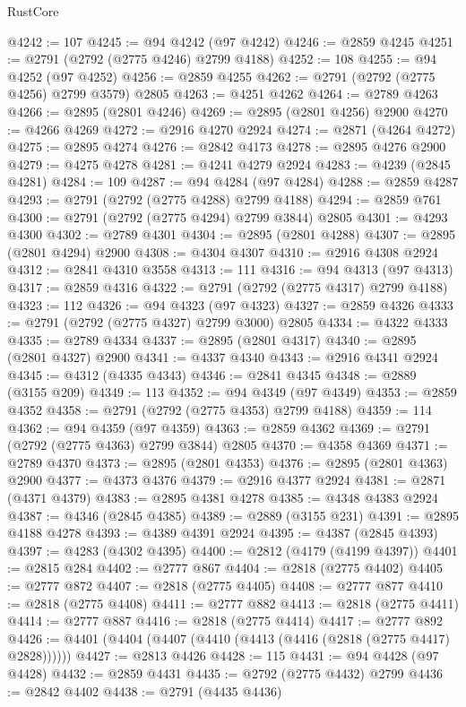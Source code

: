 \begin{lexlean}{RustCore}
\begin{coremodule}
@4242 := 107
@4245 := @94 @4242 (@97 @4242)
@4246 := @2859 @4245
@4251 := @2791 (@2792 (@2775 @4246) @2799 @4188)
@4252 := 108
@4255 := @94 @4252 (@97 @4252)
@4256 := @2859 @4255
@4262 := @2791 (@2792 (@2775 @4256) @2799 @3579) @2805
@4263 := @4251 @4262
@4264 := @2789 @4263
@4266 := @2895 (@2801 @4246)
@4269 := @2895 (@2801 @4256) @2900
@4270 := @4266 @4269
@4272 := @2916 @4270 @2924
@4274 := @2871 (@4264 @4272)
@4275 := @2895 @4274
@4276 := @2842 @4173
@4278 := @2895 @4276 @2900
@4279 := @4275 @4278
@4281 := @4241 @4279 @2924
@4283 := @4239 (@2845 @4281)
@4284 := 109
@4287 := @94 @4284 (@97 @4284)
@4288 := @2859 @4287
@4293 := @2791 (@2792 (@2775 @4288) @2799 @4188)
@4294 := @2859 @761
@4300 := @2791 (@2792 (@2775 @4294) @2799 @3844) @2805
@4301 := @4293 @4300
@4302 := @2789 @4301
@4304 := @2895 (@2801 @4288)
@4307 := @2895 (@2801 @4294) @2900
@4308 := @4304 @4307
@4310 := @2916 @4308 @2924
@4312 := @2841 @4310 @3558
@4313 := 111
@4316 := @94 @4313 (@97 @4313)
@4317 := @2859 @4316
@4322 := @2791 (@2792 (@2775 @4317) @2799 @4188)
@4323 := 112
@4326 := @94 @4323 (@97 @4323)
@4327 := @2859 @4326
@4333 := @2791 (@2792 (@2775 @4327) @2799 @3000) @2805
@4334 := @4322 @4333
@4335 := @2789 @4334
@4337 := @2895 (@2801 @4317)
@4340 := @2895 (@2801 @4327) @2900
@4341 := @4337 @4340
@4343 := @2916 @4341 @2924
@4345 := @4312 (@4335 @4343)
@4346 := @2841 @4345
@4348 := @2889 (@3155 @209)
@4349 := 113
@4352 := @94 @4349 (@97 @4349)
@4353 := @2859 @4352
@4358 := @2791 (@2792 (@2775 @4353) @2799 @4188)
@4359 := 114
@4362 := @94 @4359 (@97 @4359)
@4363 := @2859 @4362
@4369 := @2791 (@2792 (@2775 @4363) @2799 @3844) @2805
@4370 := @4358 @4369
@4371 := @2789 @4370
@4373 := @2895 (@2801 @4353)
@4376 := @2895 (@2801 @4363) @2900
@4377 := @4373 @4376
@4379 := @2916 @4377 @2924
@4381 := @2871 (@4371 @4379)
@4383 := @2895 @4381 @4278
@4385 := @4348 @4383 @2924
@4387 := @4346 (@2845 @4385)
@4389 := @2889 (@3155 @231)
@4391 := @2895 @4188 @4278
@4393 := @4389 @4391 @2924
@4395 := @4387 (@2845 @4393)
@4397 := @4283 (@4302 @4395)
@4400 := @2812 (@4179 (@4199 @4397))
@4401 := @2815 @284
@4402 := @2777 @867
@4404 := @2818 (@2775 @4402)
@4405 := @2777 @872
@4407 := @2818 (@2775 @4405)
@4408 := @2777 @877
@4410 := @2818 (@2775 @4408)
@4411 := @2777 @882
@4413 := @2818 (@2775 @4411)
@4414 := @2777 @887
@4416 := @2818 (@2775 @4414)
@4417 := @2777 @892
@4426 := @4401 (@4404 (@4407 (@4410 (@4413 (@4416 (@2818 (@2775 @4417) @2828))))))
@4427 := @2813 @4426
@4428 := 115
@4431 := @94 @4428 (@97 @4428)
@4432 := @2859 @4431
@4435 := @2792 (@2775 @4432) @2799
@4436 := @2842 @4402
@4438 := @2791 (@4435 @4436)

\end{coremodule}
\end{lexlean}
